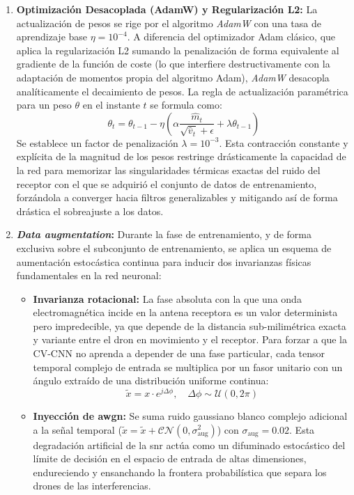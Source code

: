 \begin{enumerate}
    \item \textbf{Optimización Desacoplada (AdamW) y Regularización L2:}
    La actualización de pesos se rige por el algoritmo \textit{AdamW} \cite{loshchilov_decoupled_2019} con una tasa de aprendizaje base $\eta = 10^{-4}$. A diferencia del optimizador Adam clásico, que aplica la regularización L2 sumando la penalización de forma equivalente al gradiente de la función de coste (lo que interfiere destructivamente con la adaptación de momentos propia del algoritmo Adam), \textit{AdamW} desacopla analíticamente el decaimiento de pesos. La regla de actualización paramétrica para un peso $\theta$ en el instante $t$ se formula como:
    \begin{equation}
        \theta_{t} = \theta_{t-1} - \eta \left( \alpha \frac{\hat{m}_t}{\sqrt{\hat{v}_t} + \epsilon} + \lambda \theta_{t-1} \right)
    \end{equation}
    Se establece un factor de penalización $\lambda = 10^{-3}$. Esta contracción constante y explícita de la magnitud de los pesos restringe drásticamente la capacidad de la red para memorizar las singularidades térmicas exactas del ruido del receptor con el que se adquirió el conjunto de datos de entrenamiento, forzándola a converger hacia filtros generalizables y mitigando así de forma drástica el sobreajuste a los datos.

    \item \textbf{\textit{Data augmentation}:}
    Durante la fase de entrenamiento, y de forma exclusiva sobre el subconjunto de entrenamiento, se aplica un esquema de aumentación estocástica continua para inducir dos invarianzas físicas fundamentales en la red neuronal:
    \begin{itemize}
        \item \textbf{Invarianza rotacional:} La fase absoluta con la que una onda electromagnética incide en la antena receptora es un valor determinista pero impredecible, ya que depende de la distancia sub-milimétrica exacta y variante entre el dron en movimiento y el receptor. Para forzar a que la CV-CNN no aprenda a depender de una fase particular, cada tensor temporal complejo de entrada se multiplica por un fasor unitario con un ángulo extraído de una distribución uniforme continua:
        \begin{equation}
            \tilde{x} = x \cdot e^{j\Delta\phi}, \quad \Delta\phi \sim \mathcal{U}(0, 2\pi)
        \end{equation}
        \item \textbf{Inyección de \gls{awgn}:} Se suma ruido gaussiano blanco complejo adicional a la señal temporal ($\tilde{x} = \tilde{x} + \mathcal{CN}(0, \sigma_{\text{aug}}^2)$) con $\sigma_{\text{aug}} = 0.02$. Esta degradación artificial de la \gls{snr} actúa como un difuminado estocástico del límite de decisión en el espacio de entrada de altas dimensiones, endureciendo y ensanchando la frontera probabilística que separa los drones de las interferencias.
    \end{itemize}
\end{enumerate}

